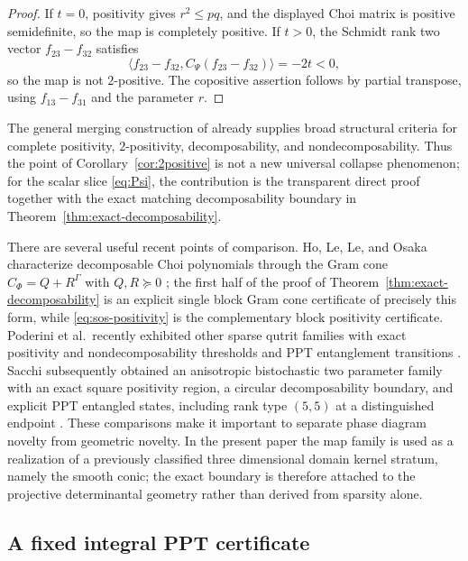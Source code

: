 \documentclass[11pt]{amsart}
\newcommand{\chg}[1]{#1}
\newcommand{\newrev}[1]{#1}
\theoremstyle{plain}
\theoremstyle{definition}
\theoremstyle{remark}
\begin{document}
\begin{proof}
If $t=0$, positivity gives $r^2\le pq$, and the displayed Choi matrix is positive semidefinite, so the map is completely positive. If $t>0$, the \chg{Schmidt rank two} vector $f_{23}-f_{32}$ satisfies
\[
\langle f_{23}-f_{32},C_\Psi(f_{23}-f_{32})\rangle=-2t<0,
\]
so the map is not $2$-positive. The copositive assertion follows by partial transpose, using $f_{13}-f_{31}$ and the parameter $r$.
\end{proof}

The general merging construction of \cite{MarciniakRutkowski2017} already supplies broad structural criteria for complete positivity, $2$-positivity, decomposability, and nondecomposability. Thus the point of Corollary~\ref{cor:2positive} is not a new universal collapse phenomenon; for the scalar slice \eqref{eq:Psi}, the contribution is the transparent direct proof together with the exact matching decomposability boundary in Theorem~\ref{thm:exact-decomposability}.

There are several useful recent points of comparison. Ho, Le, Le, and Osaka characterize decomposable Choi polynomials through the Gram cone $C_\Phi=Q+R^\Gamma$ with $Q,R\succeq0$ \cite{HoLeLeOsaka2026}; the first half of the proof of Theorem~\ref{thm:exact-decomposability} is an explicit \chg{single block Gram cone} certificate of precisely this form, while \eqref{eq:sos-positivity} is the complementary \chg{block positivity} certificate. \chg{Poderini et al.\ recently exhibited other sparse qutrit families with exact positivity and nondecomposability thresholds and PPT entanglement transitions \cite{PoderiniEtAl2026}.} \newrev{Sacchi subsequently obtained an anisotropic bistochastic two parameter family with an exact square positivity region, a circular decomposability boundary, and explicit PPT entangled states, including rank type $(5,5)$ at a distinguished endpoint \cite{Sacchi2026}. These comparisons make it important to separate phase diagram novelty from geometric novelty. In the present paper the map family is used as a realization of a previously classified three dimensional domain kernel stratum, namely the smooth conic; the exact boundary is therefore attached to the projective determinantal geometry rather than derived from sparsity alone.}

\subsection{A fixed integral PPT certificate}
\end{document}
